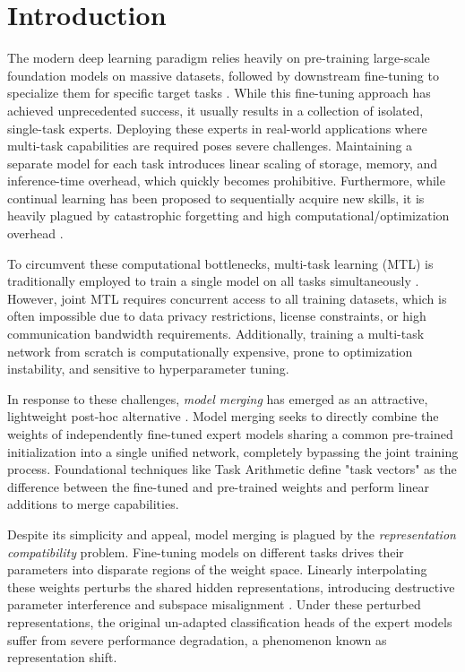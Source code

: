 \documentclass{article}
\theoremstyle{plain}
\theoremstyle{definition}
\theoremstyle{remark}
\begin{document}
\section{Introduction}
\label{submission-sec:intro}
The modern deep learning paradigm relies heavily on pre-training large-scale foundation models on massive datasets, followed by downstream fine-tuning to specialize them for specific target tasks \cite{radford2019language, brown2020language, touvron2023llama, dosovitskiy2020image}. While this fine-tuning approach has achieved unprecedented success, it usually results in a collection of isolated, single-task experts. Deploying these experts in real-world applications where multi-task capabilities are required poses severe challenges. Maintaining a separate model for each task introduces linear scaling of storage, memory, and inference-time overhead, which quickly becomes prohibitive. Furthermore, while continual learning has been proposed to sequentially acquire new skills, it is heavily plagued by catastrophic forgetting \cite{kirkpatrick2017overcoming, zenke2017continual} and high computational/optimization overhead \cite{lopez2017gradient, chaudhry2018efficient, aljundi2018memory, mallya2018packnet}.

To circumvent these computational bottlenecks, multi-task learning (MTL) is traditionally employed to train a single model on all tasks simultaneously \cite{caruana1997multitask}. However, joint MTL requires concurrent access to all training datasets, which is often impossible due to data privacy restrictions, license constraints, or high communication bandwidth requirements. Additionally, training a multi-task network from scratch is computationally expensive, prone to optimization instability, and sensitive to hyperparameter tuning.

In response to these challenges, \textit{model merging} has emerged as an attractive, lightweight post-hoc alternative \cite{wortsman2022model, ilharco2022editing}. Model merging seeks to directly combine the weights of independently fine-tuned expert models sharing a common pre-trained initialization into a single unified network, completely bypassing the joint training process. Foundational techniques like Task Arithmetic \cite{ilharco2022editing} define "task vectors" as the difference between the fine-tuned and pre-trained weights and perform linear additions to merge capabilities.

Despite its simplicity and appeal, model merging is plagued by the \textit{representation compatibility} problem. Fine-tuning models on different tasks drives their parameters into disparate regions of the weight space. Linearly interpolating these weights perturbs the shared hidden representations, introducing destructive parameter interference and subspace misalignment \cite{yadav2023ties, yu2024dare, yang2026orthogonal}. Under these perturbed representations, the original un-adapted classification heads of the expert models suffer from severe performance degradation, a phenomenon known as representation shift.
\end{document}
